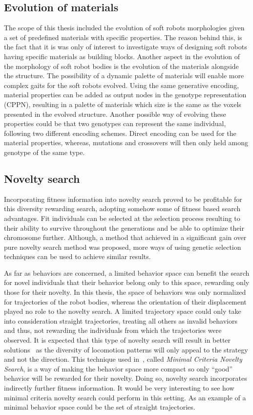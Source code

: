 \subsection*{Evolution of materials}
The scope of this thesis included the evolution of soft robots morphologies given a set of predefined materials with specific properties. The reason behind this, is the fact that it is was only of interest to investigate ways of designing soft robots having specific materials as building blocks. Another aspect in the evolution of the morphology of soft robot bodies is the evolution of the materials alongside the structure. The possibility of a dynamic palette of materials will enable more complex gaits for the soft robots evolved. Using the same generative encoding, material properties can be added as output nodes in the genotype representation (CPPN), resulting in a palette of materials which size is the same as the voxels presented in the evolved structure. Another possible way of evolving these properties could be that two genotypes can represent the same individual, following two different encoding schemes. Direct encoding can be used for the material properties, whereas, mutations and crossovers will then only held among genotype of the same type.

\subsection*{Novelty search}
Incorporating fitness information into novelty search proved to be profitable for this diversity rewarding search, adopting somehow some of fitness based search advantages. Fit individuals can be selected at the selection process resulting to their ability to survive throughout the generations and be able to optimize their chromosome further. Although, a method  that achieved in a significant gain over pure novelty search method was proposed, more ways of using genetic selection techniques can be used to achieve similar results.

As far as behaviors are concerned, a limited behavior space can benefit the search for novel individuals that their behavior belong only to this space, rewarding only those for their novelty. In this thesis, the space of behaviors was only normalized for trajectories of the robot bodies, whereas the orientation of their displacement played no role to the novelty search. A limited trajectory space could only take into consideration straight trajectories, treating all others as invalid behaviors and thus, not rewarding the individuals from which the trajectories were observed. It is expected that this type of novelty search will result in better solutions~\citep{lehman2011abandoning} as the diversity of locomotion patterns will only appeal to the strategy and not the direction. This technique used in~\citep{lehman2011abandoning}, called \emph{Minimal Criteria Novelty Search}, is a way of making the behavior space more compact so only ``good'' behavior will be rewarded for their novelty. Doing so, novelty search incorporates indirectly further fitness information. It would be very interesting to see how minimal criteria novelty search could perform in this setting. As an example of a minimal behavior space could be the set of straight trajectories.

